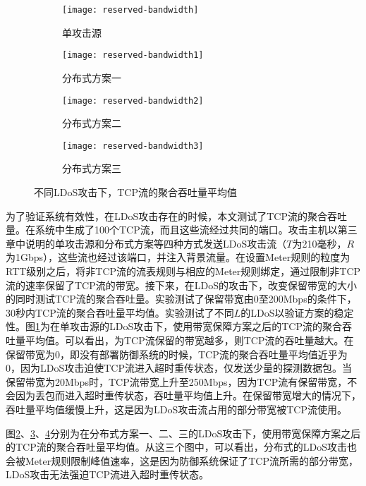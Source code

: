 \begin{figure}
    \begin{subfigure}{.49\textwidth}
        \centering
        \texttt{[image: reserved-bandwidth]}
        \caption{单攻击源}
        \label{fig:reserved-bandwidth-single}
    \end{subfigure}
    \begin{subfigure}{.49\textwidth}
        \centering
        \texttt{[image: reserved-bandwidth1]}
        \caption{分布式方案一}
        \label{fig:reserved-bandwidth-2h-mod1}
    \end{subfigure}

    \begin{subfigure}{.49\textwidth}
        \centering
        \texttt{[image: reserved-bandwidth2]}
        \caption{分布式方案二}
        \label{fig:reserved-bandwidth-2h-mod2}
    \end{subfigure}
    \begin{subfigure}{.49\textwidth}
        \centering
        \texttt{[image: reserved-bandwidth3]}
        \caption{分布式方案三}
        \label{fig:reserved-bandwidth-2h-mod3}
    \end{subfigure}


    \caption{不同LDoS攻击下，TCP流的聚合吞吐量平均值}
    \label{fig:reserved-bandwidth-all}
\end{figure}
为了验证系统有效性，在LDoS攻击存在的时候，本文测试了TCP流的聚合吞吐量。在系统中生成了100个TCP流，而且这些流经过共同的端口。攻击主机以第三章中说明的单攻击源和分布式方案等四种方式发送LDoS攻击流（$T$为210毫秒，$R$为1Gbps），这些流也经过该端口，并注入背景流量。在设置Meter规则的粒度为RTT级别之后，将非TCP流的流表规则与相应的Meter规则绑定，通过限制非TCP流的速率保留了TCP流的带宽。接下来，在LDoS的攻击下，改变保留带宽的大小的同时测试TCP流的聚合吞吐量。实验测试了保留带宽由0至200Mbps的条件下，30秒内TCP流的聚合吞吐量平均值。实验测试了不同$L$的LDoS以验证方案的稳定性。图\ref{fig:reserved-bandwidth-single}为在单攻击源的LDoS攻击下，使用带宽保障方案之后的TCP流的聚合吞吐量平均值。可以看出，为TCP流保留的带宽越多，则TCP流的吞吐量越大。在保留带宽为0，即没有部署防御系统的时候，TCP流的聚合吞吐量平均值近乎为0，因为LDoS攻击迫使TCP流进入超时重传状态，仅发送少量的探测数据包。当保留带宽为20Mbps时，TCP流带宽上升至250Mbps，因为TCP流有保留带宽，不会因为丢包而进入超时重传状态，吞吐量平均值上升。在保留带宽增大的情况下，吞吐量平均值缓慢上升，这是因为LDoS攻击流占用的部分带宽被TCP流使用。

图\ref{fig:reserved-bandwidth-2h-mod1}、\ref{fig:reserved-bandwidth-2h-mod2}、\ref{fig:reserved-bandwidth-2h-mod3}分别为在分布式方案一、二、三的LDoS攻击下，使用带宽保障方案之后的TCP流的聚合吞吐量平均值。从这三个图中，可以看出，分布式的LDoS攻击也会被Meter规则限制峰值速率，这是因为防御系统保证了TCP流所需的部分带宽，LDoS攻击无法强迫TCP流进入超时重传状态。



